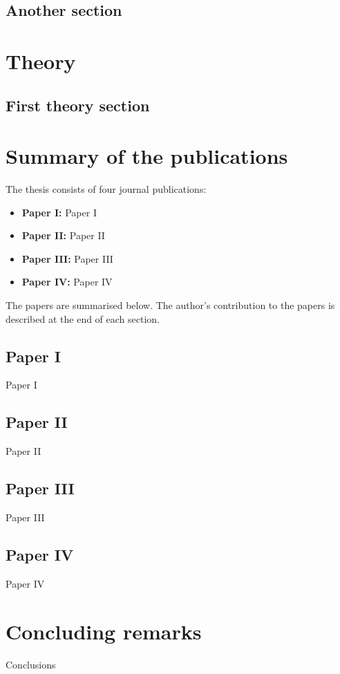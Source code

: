 \documentclass[b5paper,11pt,english,twoside]{report}
\begin{document}
\section{Another section}

\lipsum[9-11]


\chapter{Theory}

\section{First theory section}

\lipsum





\chapter{Summary of the publications}

The thesis consists of four journal publications:
\begin{itemize}
  \item \textbf{Paper I:} Paper I
  \item \textbf{Paper II:} Paper II
  \item \textbf{Paper III:} Paper III
  \item \textbf{Paper IV:} Paper IV
\end{itemize}
The papers are summarised below. The author's contribution to the papers is
described at the end of each section.

\section{Paper I}
Paper I

\section{Paper II}
Paper II

\section{Paper III}
Paper III

\section{Paper IV}
Paper IV

\chapter{Concluding remarks}
Conclusions



\end{document}

